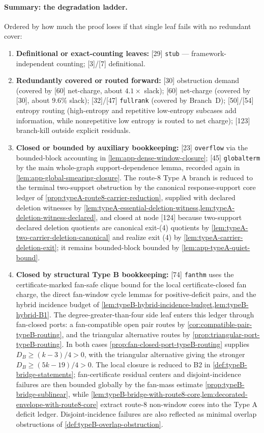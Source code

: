 \documentclass[11pt]{article}
\begin{document}
\paragraph{Summary: the degradation ladder.}
Ordered by how much the proof loses if that single leaf fails with no redundant cover:
\begin{enumerate}[label=\arabic*., leftmargin=1.8em]
\item \textbf{Definitional or exact-counting leaves:} {[29]} \texttt{stub} --- framework-independent counting; {[3]}/{[7]} definitional.
\item \textbf{Redundantly covered or routed forward:} {[30]} obstruction demand (covered by {[60]} net-charge, about $4.1\times$ slack); {[60]} net-charge (covered by {[30]}, about $9.6\%$ slack); {[32]}/{[47]} \texttt{fullrank} (covered by Branch~D); {[50]}/{[54]} entropy routing (high-entropy and repetitive low-entropy subcases add information, while nonrepetitive low entropy is routed to net charge); {[123]} branch-kill outside explicit residuals.
\item \textbf{Closed or bounded by auxiliary bookkeeping:} {[23]} \texttt{overflow} via the bounded-block accounting in \cref{lem:app-dense-window-closure}; {[45]} \texttt{globalterm} by the main whole-graph support-dependence lemma, recorded again in \cref{lem:app-global-smearing-closure}.  The route-8 Type A branch is reduced to the terminal two-support obstruction by the canonical response-support core ledger of \cref{prop:typeA-route8-carrier-reduction}, supplied with declared deletion witnesses by \cref{lem:typeA-essential-deletion-witness,lem:typeA-deletion-witness-declared}, and closed at node {[124]} because two-support declared deletion quotients are canonical exit-(4) quotients by \cref{lem:typeA-two-carrier-deletion-canonical} and realize exit (4) by \cref{lem:typeA-carrier-deletion-exit}; it remains bounded-block bounded by \cref{lem:app-typeA-quiet-bound}.
\item \textbf{Closed by structural Type B bookkeeping:} {[74]} \texttt{fanthm} uses the certificate-marked fan-safe clique bound for the local certificate-closed fan charge, the direct fan-window cycle lemmas for positive-deficit pairs, and the hybrid incidence budget of \cref{lem:typeB-hybrid-incidence-budget,lem:typeB-hybrid-B1}.  The degree-greater-than-four side leaf enters this ledger through fan-closed ports: a fan-compatible open pair routes by \cref{cor:compatible-pair-typeB-routing}, and the triangular alternative routes by \cref{prop:triangular-port-typeB-routing}.  In both cases \cref{prop:fan-closed-port-typeB-routing} supplies \(D_B\ge(k-3)/4>0\), with the triangular alternative giving the stronger \(D_B\ge(5k-19)/4>0\).  The local closure is reduced to B2 in \cref{def:typeB-bridge-statements}; fan-certificate residual centers and disjoint-incidence failures are then bounded globally by the fan-mass estimate \cref{prop:typeB-bridge-sublinear}, while \cref{lem:typeB-bridge-with-route8-core,lem:decorated-envelope-with-route8-core} extract route-8 non-window cores into the Type A deficit ledger.  Disjoint-incidence failures are also reflected as minimal overlap obstructions of \cref{def:typeB-overlap-obstruction}.

\end{enumerate}
\end{document}
